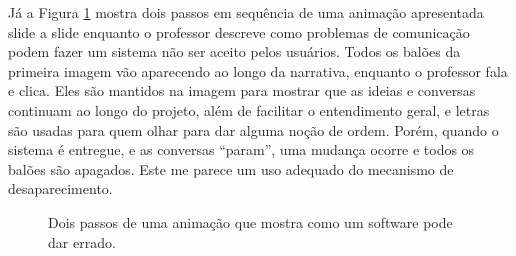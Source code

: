 Já a Figura \ref{fig:passos} mostra dois passos em sequência de uma animação apresentada slide a slide enquanto o professor descreve como problemas de comunicação podem fazer um sistema não ser aceito pelos usuários. Todos os balões da primeira imagem vão aparecendo ao longo da narrativa, enquanto o professor fala e clica. Eles são mantidos na imagem para mostrar que as ideias e conversas continuam ao longo do projeto, além de facilitar o entendimento geral, e letras são usadas para quem olhar para dar alguma noção de ordem. Porém, quando o sistema é entregue, e as conversas ``param'', uma mudança ocorre e todos os balões são apagados. Este me parece um uso adequado do mecanismo de desaparecimento.

\begin{figure}[hbt]
    \centering
    \caption{Dois passos de uma animação que mostra como um software pode dar errado.}
    \label{fig:passos}
\end{figure}


